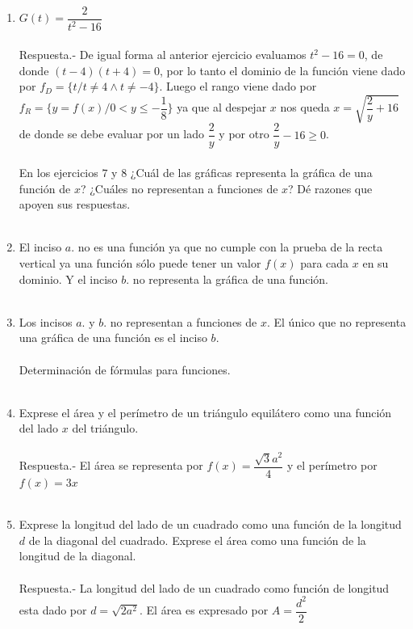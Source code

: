 \begin{enumerate}
    \item $G(t)=\dfrac{2}{t^2 - 16}$ \\\\
	Respuesta.-\; De igual forma al anterior ejercicio evaluamos $t^2 - 16 = 0$, de donde $(t - 4)(t + 4)=0$, por lo tanto el dominio de la función viene dado por $f_D=\lbrace t / t \neq 4 \land t \neq -4 \rbrace$. Luego el rango viene dado por $f_R=\lbrace y=f(x) / 0 < y \leq - \dfrac{1}{8} \rbrace$ ya que al despejar $x$ nos queda  $x=\sqrt{\dfrac{2}{y} + 16}$ de donde se debe evaluar por un lado $\dfrac{2}{y}$ y por otro $\dfrac{2}{y} - 16 \geq 0$.\\\\

    En los ejercicios $7$ y $8$ ¿Cuál de las gráficas representa la gráfica de una función de $x$? ¿Cuáles no representan a funciones de $x$? Dé razones que apoyen sus respuestas.\\\\

    \item El inciso $a.$ no es una función ya que no cumple con la prueba de la recta vertical ya una función sólo puede tener un valor $f(x)$ para cada $x$ en su dominio. Y el inciso $b.$ no representa la gráfica de una función.\\\\

    \item Los incisos $a.$ y $b.$ no representan a funciones de $x$. El único que no representa una gráfica de una función es el inciso $b.$\\\\

    Determinación de fórmulas para funciones.\\\\

    \item Exprese el área y el perímetro de un triángulo equilátero como una función del lado $x$ del triángulo.\\\\
	Respuesta.-\; El área se representa por $f(x)=\dfrac{\sqrt{3}a^2}{4}$ y el perímetro por $f(x)=3x$\\\\

    \item Exprese la longitud del lado de un cuadrado como una función de la longitud $d$ de la diagonal del cuadrado. Exprese el área como una función de la longitud de la diagonal.\\\\
	Respuesta.-\; La longitud del lado de un cuadrado como función de longitud esta dado por $d=\sqrt{2a^2}$. El área es expresado por $A=\dfrac{d^2}{2}$\\\\


\end{enumerate}
